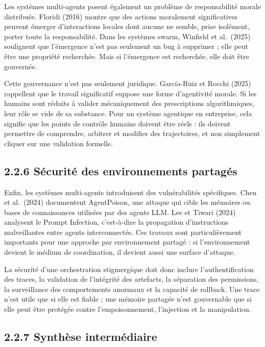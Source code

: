 Les systèmes multi-agents posent également un problème de responsabilité morale distribuée. Floridi (2016) montre que des actions moralement significatives peuvent émerger d'interactions locales dont aucune ne semble, prise isolément, porter toute la responsabilité. Dans les systèmes swarm, Winfield et al.~(2025) soulignent que l'émergence n'est pas seulement un bug à supprimer ; elle peut être une propriété recherchée. Mais si l'émergence est recherchée, elle doit être gouvernée.

Cette gouvernance n'est pas seulement juridique. García-Ruiz et Rocchi (2025) rappellent que le travail significatif suppose une forme d'agentivité morale. Si les humains sont réduits à valider mécaniquement des prescriptions algorithmiques, leur rôle se vide de sa substance. Pour un système agentique en entreprise, cela signifie que les points de contrôle humains doivent être réels : ils doivent permettre de comprendre, arbitrer et modifier des trajectoires, et non simplement cliquer sur une validation formelle.

\subsection{2.2.6 Sécurité des environnements partagés}\label{suxe9curituxe9-des-environnements-partaguxe9s}

Enfin, les systèmes multi-agents introduisent des vulnérabilités spécifiques. Chen et al.~(2024) documentent AgentPoison, une attaque qui cible les mémoires ou bases de connaissances utilisées par des agents LLM. Lee et Tiwari (2024) analysent le Prompt Infection, c'est-à-dire la propagation d'instructions malveillantes entre agents interconnectés. Ces travaux sont particulièrement importants pour une approche par environnement partagé : si l'environnement devient le médium de coordination, il devient aussi une surface d'attaque.

La sécurité d'une orchestration stigmergique doit donc inclure l'authentification des traces, la validation de l'intégrité des artefacts, la séparation des permissions, la surveillance des comportements anormaux et la capacité de rollback. Une trace n'est utile que si elle est fiable ; une mémoire partagée n'est gouvernable que si elle peut être protégée contre l'empoisonnement, l'injection et la manipulation.

\subsection{2.2.7 Synthèse intermédiaire}\label{synthuxe8se-intermuxe9diaire}

